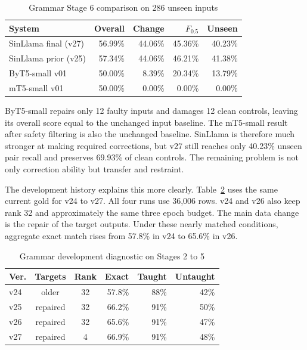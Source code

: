 \documentclass[a4paper,conference]{IEEEtran}
\begin{document}
\begin{table}[!t]
\caption{Grammar Stage 6 comparison on 286 unseen inputs}
\label{tab:grammar}
\centering
\footnotesize
\setlength{\tabcolsep}{1.9pt}
\renewcommand{\arraystretch}{1.04}
\begin{tabular}{|l|r|r|r|r|}
\hline
\textbf{System} & \textbf{Overall} & \textbf{Change} & \textbf{$F_{0.5}$} & \textbf{Unseen} \\
\hline
SinLlama final (v27) & 56.99\% & 44.06\% & 45.36\% & 40.23\% \\
\hline
SinLlama prior (v25) & 57.34\% & 44.06\% & 46.21\% & 41.38\% \\
\hline
ByT5-small v01 & 50.00\% & 8.39\% & 20.34\% & 13.79\% \\
\hline
mT5-small v01 & 50.00\% & 0.00\% & 0.00\% & 0.00\% \\
\hline
\end{tabular}
\end{table}

ByT5-small repairs only 12 faulty inputs and damages 12 clean controls, leaving
its overall score equal to the unchanged input baseline. The mT5-small result after safety filtering is also the unchanged baseline. SinLlama is therefore much
stronger at making required corrections, but v27 still reaches only 40.23\%
unseen pair recall and preserves 69.93\% of clean controls. The remaining
problem is not only correction ability but transfer and restraint.

The development history explains this more clearly. Table~\ref{tab:gdev}
uses the same current gold for v24 to v27. All four runs use 36,006 rows. v24 and
v26 also keep rank 32 and approximately the same three epoch budget. The main
data change is the repair of the target outputs. Under these nearly matched
conditions, aggregate exact match rises from 57.8\% in v24 to 65.6\% in v26.

\begin{table}[!t]
\caption{Grammar development diagnostic on Stages 2 to 5}
\label{tab:gdev}
\centering
\footnotesize
\setlength{\tabcolsep}{2.2pt}
\renewcommand{\arraystretch}{1.03}
\begin{tabular}{|l|c|c|r|r|r|}
\hline
\textbf{Ver.} & \textbf{Targets} & \textbf{Rank} & \textbf{Exact} & \textbf{Taught} & \textbf{Untaught} \\
\hline
v24 & older & 32 & 57.8\% & 88\% & 42\% \\
\hline
v25 & repaired & 32 & 66.2\% & 91\% & 50\% \\
\hline
v26 & repaired & 32 & 65.6\% & 91\% & 47\% \\
\hline
v27 & repaired & 4 & 66.9\% & 91\% & 48\% \\
\hline
\end{tabular}
\end{table}
\end{document}
